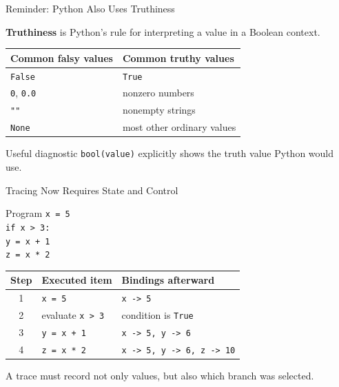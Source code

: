 \documentclass[aspectratio=169,10pt]{beamer}
\begin{document}
\begin{frame}{Reminder: Python Also Uses Truthiness}
  \begin{cpdefinition}
    \textbf{Truthiness} is Python's rule for interpreting a value in a Boolean context.
  \end{cpdefinition}

  \begin{center}
    \renewcommand{\arraystretch}{1.25}
    \begin{tabular}{l|l}
      \textbf{Common falsy values} & \textbf{Common truthy values} \\\hline
      \texttt{False} & \texttt{True} \\
      \texttt{0}, \texttt{0.0} & nonzero numbers \\
      \texttt{""} & nonempty strings \\
      \texttt{None} & most other ordinary values
    \end{tabular}
  \end{center}

  \begin{block}{Useful diagnostic}
    \centering
    \texttt{bool(value)} explicitly shows the truth value Python would use.
  \end{block}
\end{frame}

\begin{frame}{Tracing Now Requires State and Control}
  \begin{block}{Program}
    \texttt{x = 5}\\
    \texttt{if x > 3:}\\
    \hspace*{0.20in}\texttt{y = x + 1}\\
    \texttt{z = x * 2}
  \end{block}

  \begin{center}
    \renewcommand{\arraystretch}{1.20}
    \begin{tabular}{c|l|l}
      \textbf{Step} & \textbf{Executed item} & \textbf{Bindings afterward} \\\hline
      1 & \texttt{x = 5} & \texttt{x -> 5} \\
      2 & evaluate \texttt{x > 3} & condition is \texttt{True} \\
      3 & \texttt{y = x + 1} & \texttt{x -> 5, y -> 6} \\
      4 & \texttt{z = x * 2} & \texttt{x -> 5, y -> 6, z -> 10}
    \end{tabular}
  \end{center}

  \begin{keyidea}
    A trace must record not only values, but also which branch was selected.
  \end{keyidea}
\end{frame}
\end{document}
